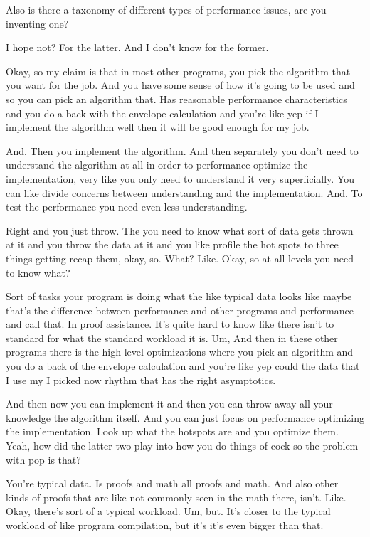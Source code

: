 \begin{subappendices}
    Also is there a taxonomy of different types of performance issues, are you inventing one?
    
    I hope not? For the latter. And I don't know for the former.
    
    Okay, so my claim is that in most other programs, you pick the algorithm that you want for the job. And you have some sense of how it's going to be used and so you can pick an algorithm that. Has reasonable performance characteristics and you do a back with the envelope calculation and you're like yep if I implement the algorithm well then it will be good enough for my job. 
    
    And. Then you implement the algorithm. And then separately you don't need to understand the algorithm at all in order to performance optimize the implementation, very like you only need to understand it very superficially. You can like divide concerns between understanding and the implementation. And. To test the performance you need even less understanding. 
    
    Right and you just throw. The you need to know what sort of data gets thrown at it and you throw the data at it and you like profile the hot spots to three things getting recap them, okay, so. What? Like. Okay, so at all levels you need to know what? 
    
    Sort of tasks your program is doing what the like typical data looks like maybe that's the difference between performance and other programs and performance and call that. In proof assistance. It's quite hard to know like there isn't to standard for what the standard workload it is. Um, And then in these other programs there is the high level optimizations where you pick an algorithm and you do a back of the envelope calculation and you're like yep could the data that I use my I picked now rhythm that has the right asymptotics. 
    
    And then now you can implement it and then you can throw away all your knowledge the algorithm itself. And you can just focus on performance optimizing the implementation. Look up what the hotspots are and you optimize them. Yeah, how did the latter two play into how you do things of cock so the problem with pop is that? 
    
    You're typical data. Is proofs and math all proofs and math. And also other kinds of proofs that are like not commonly seen in the math there, isn't. Like. Okay, there's sort of a typical workload. Um, but. It's closer to the typical workload of like program compilation, but it's it's even bigger than that. 
    

\end{subappendices}
